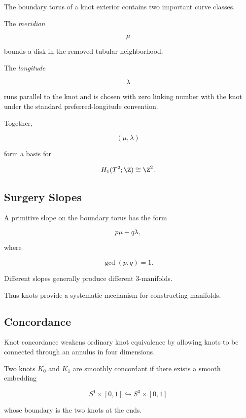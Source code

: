 The boundary torus of a knot exterior contains two important curve classes.

The \emph{meridian}

\[
\boxed{
\mu
}
\]

bounds a disk in the removed tubular neighborhood.

The \emph{longitude}

\[
\boxed{
\lambda
}
\]

runs parallel to the knot and is chosen with zero linking number with the
knot under the standard preferred-longitude convention.

Together,

\[
\boxed{
(\mu,\lambda)
}
\]

form a basis for

\[
H_1(T^2;\Z)\cong\Z^2.
\]

\subsection{Surgery Slopes}
\label{subsec:knot-surgery-slopes}

A primitive slope on the boundary torus has the form

\[
\boxed{
p\mu+q\lambda,
}
\]

where

\[
\gcd(p,q)=1.
\]

Different slopes generally produce different \(3\)-manifolds.

Thus knots provide a systematic mechanism for constructing manifolds.

\subsection{Concordance}
\label{subsec:knot-concordance}

Knot concordance weakens ordinary knot equivalence by allowing knots to be
connected through an annulus in four dimensions.

Two knots \(K_0\) and \(K_1\) are smoothly concordant if there exists a
smooth embedding

\[
\boxed{
S^1\times[0,1]
\hookrightarrow
S^3\times[0,1]
}
\]

whose boundary is the two knots at the ends.

